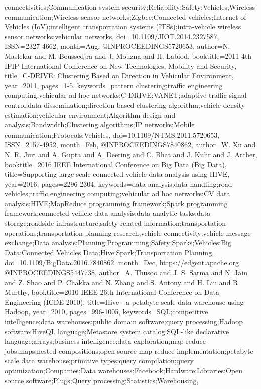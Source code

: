 \documentclass{thesis}
\begin{document}
\begin{singlespace}
\begin{thebibliography}{99}
{{    connectivities;Communication system security;Reliability;Safety;Vehicles;Wireless communication;Wireless sensor networks;Zigbee;Connected vehicles;Internet of Vehicles (IoV);intelligent transportation systems (ITSs);intra-vehicle wireless sensor networks;vehicular networks}, 
    doi={10.1109/JIOT.2014.2327587}, 
    ISSN={2327-4662}, 
    month={Aug},}
@INPROCEEDINGS{5720653, 
    author={N. Maslekar and M. Boussedjra and J. Mouzna and H. Labiod}, 
    booktitle={2011 4th IFIP International Conference on New Technologies, Mobility and Security}, 
    title={C-DRIVE: Clustering Based on Direction in Vehicular Environment}, 
    year={2011}, 
    pages={1-5}, 
    keywords={pattern clustering;traffic engineering computing;vehicular ad hoc networks;C-DRIVE;VANET;adaptive traffic signal control;data dissemination;direction based clustering algorithm;vehicle density estimation;vehicular environment;Algorithm design and analysis;Bandwidth;Clustering algorithms;IP networks;Mobile communication;Protocols;Vehicles}, 
    doi={10.1109/NTMS.2011.5720653}, 
    ISSN={2157-4952}, 
    month={Feb},}
@INPROCEEDINGS{7840862, 
    author={W. Xu and N. R. Juri and A. Gupta and A. Deering and C. Bhat and J. Kuhr and J. Archer}, 
    booktitle={2016 IEEE International Conference on Big Data (Big Data)}, 
    title={Supporting large scale connected vehicle data analysis using HIVE}, 
    year={2016}, 
    pages={2296-2304}, 
    keywords={data analysis;data handling;road vehicles;traffic engineering computing;vehicular ad hoc networks;CV data analysis;HIVE;MapReduce programming framework;Spark programming framework;connected vehicle data analysis;data analytic tasks;data storage;roadside infrastructure;safety-related information;transportation operations;transportation planning research;vehicle connectivity;vehicle message exchange;Data analysis;Planning;Programming;Safety;Sparks;Vehicles;Big Data;Connected Vehicles Data;Hive;Spark;Transportation Planning}, 
    doi={10.1109/BigData.2016.7840862}, 
    month={Dec},}
    https://edgent.apache.org
@INPROCEEDINGS{5447738, 
author={A. Thusoo and J. S. Sarma and N. Jain and Z. Shao and P. Chakka and N. Zhang and S. Antony and H. Liu and R. Murthy}, 
booktitle={2010 IEEE 26th International Conference on Data Engineering (ICDE 2010)}, 
title={Hive - a petabyte scale data warehouse using Hadoop}, 
year={2010}, 
pages={996-1005}, 
keywords={SQL;competitive intelligence;data warehouses;public domain software;query processing;Hadoop software;HiveQL language;Metastore system catalog;SQL-like declarative language;arrays;business intelligence;data exploration;map-reduce jobs;maps;nested compositions;open-source map-reduce implementation;petabyte scale data warehouse;primitive types;query compilation;query optimization;Companies;Data warehouses;Facebook;Hardware;Libraries;Open source software;Plugs;Query processing;Statistics;Warehousing}, 
}
\end{thebibliography}
\end{singlespace}
\end{document}
